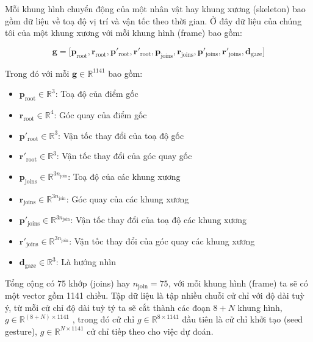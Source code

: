 Mỗi khung hình chuyển động của một nhân vật hay khung xương (skeleton) bao gồm dữ liệu về toạ độ vị trí và vận tốc theo thời gian.
Ở đây dữ liệu của chúng tôi của một khung xương với mỗi khung hình (frame) bao gồm:

\begin{equation} \label{eq:gesturevector}
\mathbf{g} = \Big[ \mathbf{p}_{\text{root}},  \mathbf{r}_{\text{root}},
\mathbf{ p }'_{\text{root}},  \mathbf{r}'_{\text{root}},
\mathbf{p}_{\text{joins}},  \mathbf{r}_{\text{joins}},
\mathbf{p}'_{\text{joins}},  \mathbf{r}'_{\text{joins}},
\mathbf{d}_{\text{gaze}}
\Big]
\end{equation}



Trong  đó với mỗi $\mathbf{g} \in \mathbb{R}^{1141}$ bao gồm:
{
	\small

\begin{itemize}
	\item $\mathbf{p}_{\text{root}} \in \mathbb{R}^3$: Toạ độ của điểm gốc
	\item $\mathbf{r}_{\text{root}} \in \mathbb{R}^4$: Góc quay của điểm gốc
	\item $\mathbf{p}'_{\text{root}} \in \mathbb{R}^3$: Vận tốc thay đổi của toạ độ gốc
	\item $\mathbf{r}'_{\text{root}} \in \mathbb{R}^3$: Vận tốc thay đổi của góc quay gốc
	
	\item $\mathbf{p}_{\text{joins}} \in \mathbb{R}^{3 n_{\text{join} }}$: Toạ độ của các khung xương
	\item $\mathbf{r}_{\text{joins}} \in \mathbb{R}^{3 n_{\text{join} }}$: Góc quay của các khung xương
	\item $\mathbf{p}'_{\text{joins}} \in \mathbb{R}^{3n_{\text{join} }}$: Vận tốc thay đổi của toạ độ các khung xương
	\item $\mathbf{r}'_{\text{joins}} \in \mathbb{R}^{3n_{\text{join} }}$: Vận tốc thay đổi của góc quay các khung xương
	
	\item $\mathbf{d}_{\text{gaze}} \in \mathbb{R}^3$: Là hướng nhìn
\end{itemize}}




Tổng cộng có $75$ khớp (joins) hay $n_{\text{join}} = 75$, với mỗi khung hình (frame) ta sẽ có một vector gồm 1141 chiều.
Tập dữ liệu là tập nhiều chuỗi cử chỉ với độ dài tuỳ ý, từ mỗi cử chỉ độ dài tuỳ tý ta sẽ cắt thành các đoạn $8 + N$ khung hình, $g \in \mathbb{R}^{(8+N) \times 1141}$ , trong đó cử chỉ $g \in \mathbb{R}^{8 \times 1141}$ đầu tiên là cử chỉ khởi tạo (seed gesture), $g \in \mathbb{R}^{N \times 1141}$ cử chỉ tiếp theo cho việc dự đoán.



